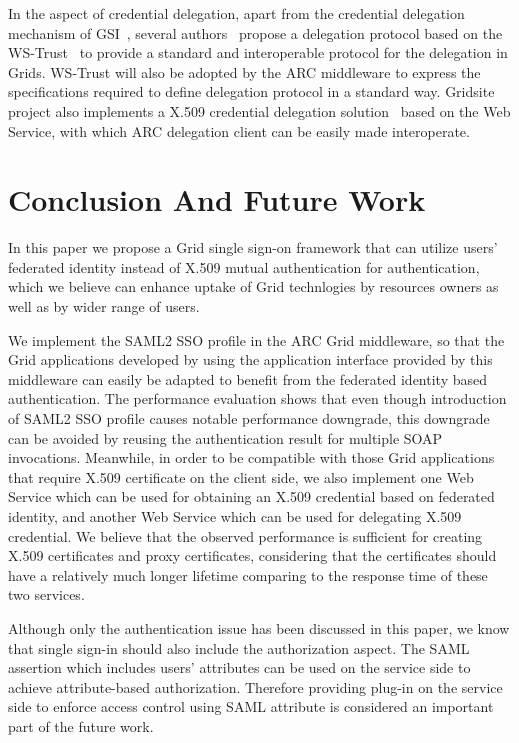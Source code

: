 \documentclass[conference]{IEEEtran}
\begin{document}
In the aspect of credential delegation, apart from the credential delegation
mechanism of GSI~\cite{IFoster98,VWelch04}, several authors~\cite{MAhsant04} propose a
delegation protocol based on the WS-Trust~\cite{WSTrustlink} to provide a standard and interoperable
protocol for the delegation in Grids. WS-Trust will also be adopted by the ARC middleware
to express the specifications required to define delegation protocol in a standard way.
Gridsite project also implements a X.509 credential delegation solution~\cite{GridSitelink} based on
the Web Service, with which ARC delegation client can be easily made interoperate.

\section{Conclusion And Future Work}
\label{sec:conclusion}
In this paper we propose a Grid single sign-on framework that can utilize
users' federated identity instead of X.509 mutual authentication for authentication,
which we believe can enhance uptake of Grid technlogies by resources owners as well as
by wider range of users.

We implement the SAML2 SSO profile in the ARC Grid middleware, so that the Grid
applications developed by using the application interface provided by this middleware
can easily be adapted to benefit from the federated identity based authentication. 
The performance evaluation shows that even though introduction of SAML2 SSO
profile causes notable performance downgrade, this downgrade can be avoided by reusing the
authentication result for multiple SOAP invocations.
Meanwhile, in order to be compatible with those Grid applications that require
X.509 certificate on the client side, we also implement one Web Service which can be
used for obtaining an X.509 credential based on federated identity, and another Web
Service which can be used for delegating X.509 credential. We believe that the
observed performance is sufficient for creating X.509 certificates and proxy certificates,
considering that the certificates should have a relatively much longer lifetime comparing to the
response time of these two services.
 
Although only the authentication issue has been discussed in this paper, we know that
single sign-in should also include the authorization aspect. The SAML assertion which
includes users' attributes can be used on the service side to achieve attribute-based
authorization. Therefore providing plug-in on the service side to enforce access control using
SAML attribute is considered an important part of the future work.
\end{document}

